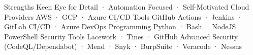 


\begin{cvaboutme}
    \cvabout
        {Strengths}
        {Keen Eye for Detail · Automation Focused · Self-Motivated}
    \cvabout
        {Cloud Providers}
        {AWS · GCP · Azure}
    \cvabout
        {CI/CD Tools}
        {GitHub Actions · Jenkins · GitLab CI/CD · Azure DevOps}
    \cvabout
        {Programming}
        {Python · Bash · NodeJS · PowerShell}
    \cvabout
        {Security Tools}
        {Lacework · Tines · GitHub Advanced Security (CodeQL/Dependabot) · Mend · Snyk · BurpSuite · Veracode · Nessus}
\cvsubsection{}
\end{cvaboutme}